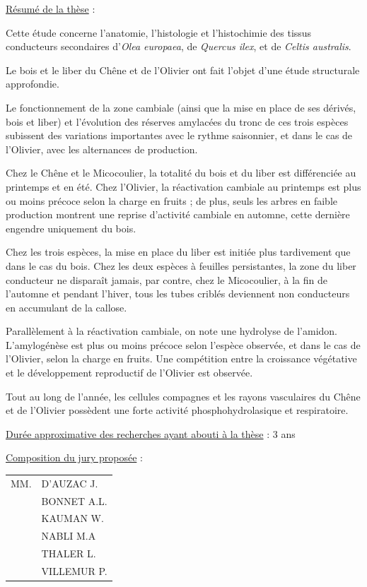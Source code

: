 \uline{Résumé de la thèse} :

Cette étude concerne l'anatomie, l'histologie et l'histochimie des tissus conducteurs secondaires d'\textit{Olea europaea}, de \textit{Quercus ilex}, et de \textit{Celtis australis}.

Le bois et le liber du Chêne et de l'Olivier ont fait l'objet d'une étude structurale approfondie.

Le fonctionnement de la zone cambiale (ainsi que la mise en place de ses dérivés, bois et liber) et l'évolution des réserves amylacées du tronc de ces trois espèces subissent des variations importantes avec le rythme saisonnier, et dans le cas de l'Olivier, avec les alternances de production.

Chez le Chêne et le Micocoulier, la totalité du bois et du liber est différenciée au printemps et en été. Chez l'Olivier, la réactivation cambiale au printemps est plus ou moins précoce selon la charge en fruits ; de plus, seuls les arbres en faible production montrent une reprise d'activité cambiale en automne, cette dernière engendre uniquement du bois.

Chez les trois espèces, la mise en place du liber est initiée plus tardivement que dans le cas du bois. Chez les deux espèces à feuilles persistantes, la zone du liber conducteur ne disparaît jamais, par contre, chez le Micocoulier, à la fin de l'automne et pendant l'hiver, tous les tubes criblés deviennent non conducteurs en accumulant de la callose.

Parallèlement à la réactivation cambiale, on note une hydrolyse de l'amidon. L'amylogénèse est plus ou moins précoce selon l'espèce observée, et dans le cas de l'Olivier, selon la charge en fruits. Une compétition entre la croissance végétative et le développement reproductif de l'Olivier est observée.

Tout au long de l'année, les cellules compagnes et les rayons vasculaires du Chêne et de l'Olivier possèdent une forte activité phosphohydrolasique et respiratoire.

\uline{Durée approximative des recherches ayant abouti à la thèse} : 3 ans

\uline{Composition du jury proposée} :

\begin{tabular}{ll}
MM. & D'AUZAC J.\\
& BONNET A.L.\\
& KAUMAN W.\\
& NABLI M.A\\
& THALER L.\\
& VILLEMUR P.
\end{tabular}


